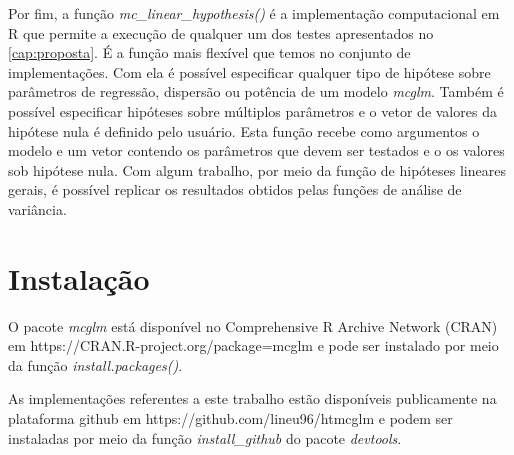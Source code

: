 Por fim, a função \emph{mc\_linear\_hypothesis()} é a implementação computacional em R que permite a execução de qualquer um dos testes apresentados no \autoref{cap:proposta}. É a função mais flexível que temos no conjunto de implementações. Com ela é possível especificar qualquer tipo de hipótese sobre parâmetros de regressão, dispersão ou potência de um modelo \emph{mcglm}. Também é possível especificar hipóteses sobre múltiplos parâmetros e o vetor de valores da hipótese nula é definido pelo usuário. Esta função recebe como argumentos o modelo e um vetor contendo os parâmetros que devem ser testados e o os valores sob hipótese nula. Com algum trabalho, por meio da função de hipóteses lineares gerais, é possível replicar os resultados obtidos pelas funções de análise de variância.


\section{Instalação}

O pacote \emph{mcglm} está disponível no Comprehensive R Archive Network (CRAN) em https://CRAN.R-project.org/package=mcglm e pode ser instalado por meio da função \emph{install.packages()}.

\begin{knitrout}
\color{fgcolor}\begin{kframe}
\begin{alltt}
\hlstd{(}\hlstd{)}
\end{alltt}
\end{kframe}
\end{knitrout}

As implementações referentes a este trabalho estão disponíveis publicamente na plataforma github em https://github.com/lineu96/htmcglm e podem ser instaladas por meio da função \emph{install\_github} do pacote \emph{devtools}.

\begin{knitrout}
\color{fgcolor}\begin{kframe}
\begin{alltt}
\hlstd{(}\hlstd{)}
\end{alltt}
\end{kframe}
\end{knitrout}


